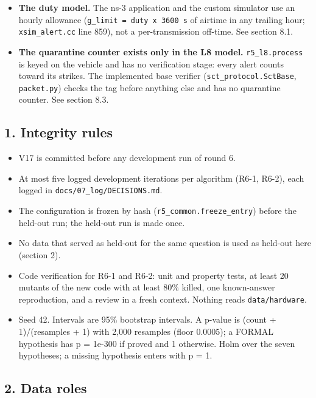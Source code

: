 \begin{itemize}
\item \textbf{The duty model.} The ns-3 application and the custom simulator use an hourly allowance (\texttt{g\_limit = duty x 3600 s} of airtime in any trailing hour; \texttt{xsim\_alert.cc} line 859), not a per-transmission off-time. See section 8.1.
\item \textbf{The quarantine counter exists only in the L8 model.} \texttt{r5\_l8.process} is keyed on the vehicle and has no verification stage: every alert counts toward its strikes. The implemented base verifier (\texttt{sct\_protocol.SctBase}, \texttt{packet.py}) checks the tag before anything else and has no quarantine counter. See section 8.3.
\end{itemize}

\subsection*{1. Integrity rules}

\begin{itemize}
\item V17 is committed before any development run of round 6.
\item At most five logged development iterations per algorithm (R6-1, R6-2), each logged in \texttt{docs/07\_log/DECISIONS.md}.
\item The configuration is frozen by hash (\texttt{r5\_common.freeze\_entry}) before the held-out run; the held-out run is made once.
\item No data that served as held-out for the same question is used as held-out here (section 2).
\item Code verification for R6-1 and R6-2: unit and property tests, at least 20 mutants of the new code with at least 80\% killed, one known-answer reproduction, and a review in a fresh context. Nothing reads \texttt{data/hardware}.
\item Seed 42. Intervals are 95\% bootstrap intervals. A p-value is (count + 1)/(resamples + 1) with 2,000 resamples (floor 0.0005); a FORMAL hypothesis has p = 1e-300 if proved and 1 otherwise. Holm over the seven hypotheses; a missing hypothesis enters with p = 1.
\end{itemize}

\subsection*{2. Data roles}

